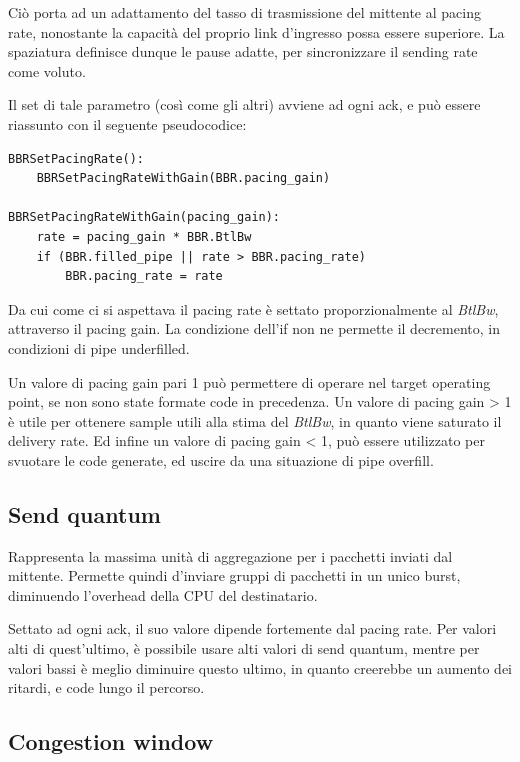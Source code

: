 Ciò porta ad un adattamento del tasso di trasmissione del mittente al pacing rate, nonostante la capacità del proprio link d'ingresso possa essere superiore. La spaziatura definisce dunque le pause adatte, per sincronizzare il sending rate come voluto. \bigskip

Il set di tale parametro (così come gli altri) avviene ad ogni ack, e può essere riassunto con il seguente pseudocodice:

\begin{lstlisting}[caption=BBRSetPacingRate]
BBRSetPacingRate():
	BBRSetPacingRateWithGain(BBR.pacing_gain)

BBRSetPacingRateWithGain(pacing_gain):
	rate = pacing_gain * BBR.BtlBw
	if (BBR.filled_pipe || rate > BBR.pacing_rate)
		BBR.pacing_rate = rate

\end{lstlisting}

Da cui come ci si aspettava il pacing rate è settato proporzionalmente al \textit{BtlBw}, attraverso il pacing gain.
La condizione dell'if non ne permette il decremento, in condizioni di pipe underfilled. \bigskip

Un valore di pacing gain pari 1 può permettere di operare nel target operating point, se non sono state formate code in precedenza. Un valore di pacing gain > 1 è utile per ottenere sample utili alla stima del \textit{BtlBw}, in quanto viene saturato il delivery rate. Ed infine un valore di pacing gain < 1, può essere utilizzato per svuotare le code generate, ed uscire da una situazione di pipe overfill.

\subsection{Send quantum}

Rappresenta la massima unità di aggregazione per i pacchetti inviati dal mittente. Permette quindi d'inviare gruppi di pacchetti in un unico burst, diminuendo l'overhead della CPU del destinatario. \bigskip

Settato ad ogni ack, il suo valore dipende fortemente dal pacing rate. Per valori alti di quest'ultimo, è possibile usare alti valori di send quantum, mentre per valori bassi è meglio diminuire questo ultimo, in quanto creerebbe un aumento dei ritardi, e code lungo il percorso.

\subsection{Congestion window}

